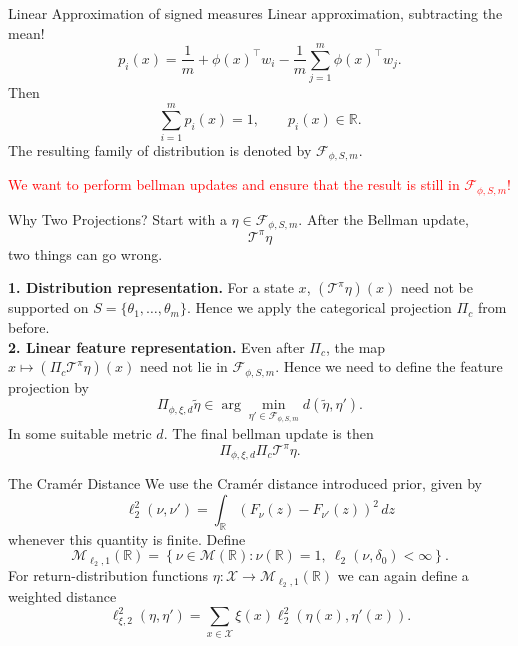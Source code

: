 \documentclass[10pt]{beamer}
\newcommand{\R}{\mathbb{R}}
\newcommand{\X}{\mathcal{X}}
\newcommand{\F}{\mathcal{F}}
\newcommand{\T}{\mathcal{T}}
\newcommand{\1}{\mathds{1}}
\begin{document}
\begin{frame}{Linear Approximation of signed measures}
  Linear approximation, subtracting the mean!
  \[
    p_i(x)
    =
    \frac1m
    +\phi(x)^\top w_i
    -\frac1m\sum_{j=1}^m\phi(x)^\top w_j .
  \]
  Then
  \[
    \sum_{i=1}^m p_i(x)=1,
    \qquad
    p_i(x)\in\R.
  \]
  The resulting family of distribution is denoted by $\F_{\phi,S,m}$.
  \pause
  \begin{center}
      \textcolor{red}{We want to perform bellman updates and ensure that the result is still in $\F_{\phi,S,m}$!}
  \end{center}
\end{frame}

\begin{frame}{Why Two Projections?}
  \small
  Start with a $\eta\in\F_{\phi,S,m}$. After the Bellman update,
  \[
    \T^\pi\eta
  \]
  two things can go wrong.

  \medskip
  \textbf{1. Distribution representation.}
  For a state $x$, $(\T^\pi\eta)(x)$ need not be supported on
  $S=\{\theta_1,\ldots,\theta_m\}$. Hence we apply the categorical projection $\Pi_c$ from before. \\


  \textbf{2. Linear feature representation.}
  Even after $\Pi_c$, the map $x\mapsto(\Pi_c\T^\pi\eta)(x)$ need not lie in
  $\F_{\phi,S,m}$. Hence we need to define the feature projection by
  \[
    \Pi_{\phi,\xi,d}\widetilde\eta
    \in
    \arg\min_{\eta'\in\F_{\phi,S,m}}
    d(\widetilde\eta,\eta').
  \]
   In some suitable metric $d$. The final bellman update is then 
  \[
    \Pi_{\phi,\xi,d}\Pi_c\T^\pi\eta. \]
\end{frame}

\begin{frame}{The Cram\'er Distance}
  We use the Cram\'er distance introduced prior, given by 
  \[
    \ell_2^2(\nu,\nu')
    =\int_\R\left(F_\nu(z)-F_{\nu'}(z)\right)^2\,dz
  \]
  whenever this quantity is finite. Define
  \[
    \mathcal M_{\ell_2,1}(\R)
    =
    \left\{
      \nu\in\mathcal M(\R):
      \nu(\R)=1,\ 
      \ell_2(\nu,\delta_0)<\infty
    \right\}.
  \]
  For return-distribution functions $\eta:\X\to\mathcal M_{\ell_2,1}(\R)$ we can again define a weighted distance
  \[
    \ell_{\xi,2}^2(\eta,\eta')
    =
    \sum_{x\in\X}\xi(x)
    \ell_2^2\!\left(\eta(x),\eta'(x)\right).
  \]
\end{frame}
\end{document}
